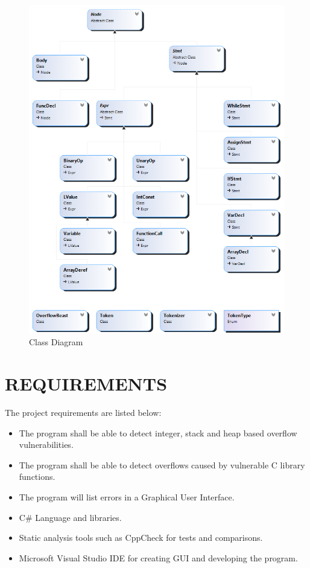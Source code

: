 \begin{figure}[!htbp]
    \centering
    \includegraphics[width=1\textwidth]{Imgs/ClassDiagram2.png}
    \caption{\label{fig:ClassDiagram}Class Diagram}
\end{figure}

\clearpage

\section{REQUIREMENTS}

The project requirements are listed below:
\begin{itemize}
    \item The program shall be able to detect integer, stack and heap based overflow vulnerabilities.
    \item The program shall be able to detect overflows caused by vulnerable C library functions.
    \item The program will list errors in a Graphical User Interface.
    \item C# Language and libraries.
    \item Static analysis tools such as CppCheck for tests and comparisons.
    \item Microsoft Visual Studio IDE for creating GUI and developing the program.
    

\end{itemize}
